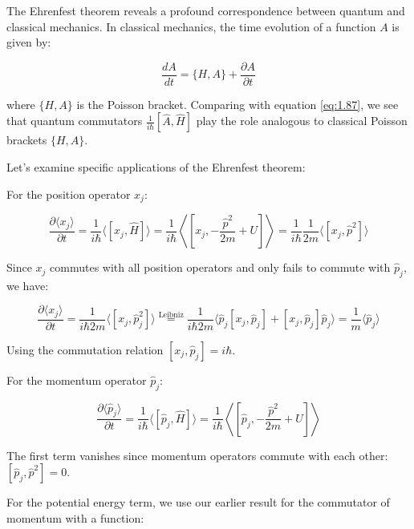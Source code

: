 \documentclass[italian]{HKNdocument}
\begin{document}
The Ehrenfest theorem reveals a profound correspondence between quantum and classical mechanics. In classical mechanics, the time evolution of a function $A$ is given by:

\begin{equation}
\frac{dA}{dt} = \{H,A\} + \frac{\partial A}{\partial t} \label{eq:1.88}
\end{equation}

where $\{H,A\}$ is the Poisson bracket. Comparing with equation \eqref{eq:1.87}, we see that quantum commutators $\frac{1}{i\hbar}[\hat{A},\hat{H}]$ play the role analogous to classical Poisson brackets $\{H,A\}$.

Let's examine specific applications of the Ehrenfest theorem:

For the position operator $x_j$:

\begin{equation}
\frac{\partial\langle x_j\rangle}{\partial t} = \frac{1}{i\hbar}\langle[x_j,\hat{H}]\rangle = \frac{1}{i\hbar}\left\langle\left[x_j,-\frac{\hat{p}^2}{2m}+U\right]\right\rangle = \frac{1}{i\hbar}\frac{1}{2m}\langle[x_j,\hat{p}^2]\rangle \label{eq:1.89}
\end{equation}

Since $x_j$ commutes with all position operators and only fails to commute with $\hat{p}_j$, we have:

\begin{equation}
\frac{\partial\langle x_j\rangle}{\partial t} = \frac{1}{i\hbar 2m}\langle[x_j,\hat{p}_j^2]\rangle \stackrel{\text{Leibniz}}{=} \frac{1}{i\hbar 2m}\langle\hat{p}_j[x_j,\hat{p}_j]+[x_j,\hat{p}_j]\hat{p}_j\rangle = \frac{1}{m}\langle\hat{p}_j\rangle \label{eq:1.90}
\end{equation}

Using the commutation relation $[x_j,\hat{p}_j] = i\hbar$.

For the momentum operator $\hat{p}_j$:

\begin{equation}
\frac{\partial\langle\hat{p}_j\rangle}{\partial t} = \frac{1}{i\hbar}\langle[\hat{p}_j,\hat{H}]\rangle = \frac{1}{i\hbar}\left\langle\left[\hat{p}_j,-\frac{\hat{p}^2}{2m}+U\right]\right\rangle \label{eq:1.91}
\end{equation}

The first term vanishes since momentum operators commute with each other: $[\hat{p}_j,\hat{p}^2] = 0$.

For the potential energy term, we use our earlier result for the commutator of momentum with a function:
\end{document}
